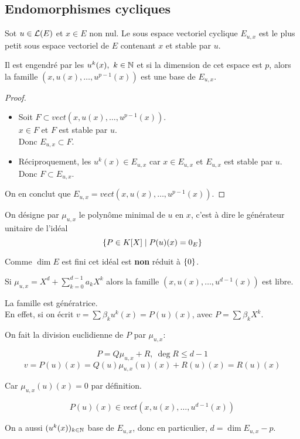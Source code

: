 \subsection{Endomorphismes cycliques}

Sot $u \in \mathcal{L}(E)$ et $x \in E$ non nul.
Le sous espace vectoriel cyclique $E_{u,x}$ est le plus petit sous espace vectoriel de $E$ contenant $x$ et stable par $u$.

Il est engendré par les $u^k(x), \ k \in \mathbb{N}$ et si la dimension de cet espace est $p$, alors la famille
$ (x, u(x), \ldots, u^{p-1}(x))$ est une base de $E_{u,x}$.

\begin{proof}
	\begin{itemize}
		\item Soit $F \subset vect (x, u(x), \ldots, u^{p-1}(x))$.\\
		      $x \in F$ et $F$ est stable par $u$.\\
		      Donc $E_{u,x} \subset F$.

		\item Réciproquement, les $u^k(x) \in E_{u,x}$ car $x \in E_{u,x}$ et $E_{u,x}$ est stable par $u$.
		      Donc $F \subset E_{u,x}$.
	\end{itemize}
	On en conclut que $E_{u,x} = vect (x, u(x), \ldots, u^{p-1}(x))$.
\end{proof}

On désigne par $\mu_{u,x}$ le polynôme minimal de $u$ en $x$, c'est à dire le générateur unitaire de l'idéal
$$ \left\{P \in K[X] \mid P(u)(x) = 0_E\right\}$$

Comme $\dim E$ est fini cet idéal est \textbf{non} réduit à $\left\{0\right\}$.


Si $\mu_{u,x} = X^d + \sum_{k=0}^{d-1} a_k X^k$ alors la famille $(x, u(x), \ldots, u^{d-1}(x))$ est libre.

La famille est génératrice.\\
En effet, si on écrit $v = \sum \beta_k u^k(x) = P(u)(x)$, avec $P = \sum \beta_k X^k$.

On fait la division euclidienne de $P$ par $\mu_{u,x}$:

$$ P = Q \mu_{u,x} + R, \ \deg R \leq d -1$$
$$ v = P(u)(x) = Q(u) \mu_{u,x}(u)(x) + R(u)(x) = R(u)(x)$$

Car $\mu_{u,x}(u)(x) = 0$ par définition.

$$ P(u)(x) \in vect (x, u(x), \ldots, u^{d-1}(x))$$

On a aussi $(u^k(x))_{k \in \mathbb{N}}$ base de $E_{u,x}$, donc en particulier, $ d = \dim E_{u,x} - p $.

